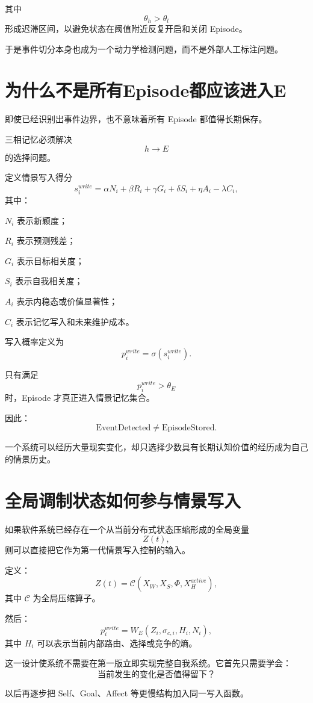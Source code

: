 其中
\[
\theta_h>\theta_l
\]
形成迟滞区间，以避免状态在阈值附近反复开启和关闭 Episode。

于是事件切分本身也成为一个动力学检测问题，而不是外部人工标注问题。

\section{为什么不是所有Episode都应该进入E}

即使已经识别出事件边界，也不意味着所有 Episode 都值得长期保存。

三相记忆必须解决
\[
h\rightarrow E
\]
的选择问题。

定义情景写入得分
\[
s_i^{write}
=
\alpha N_i
+
\beta R_i
+
\gamma G_i
+
\delta S_i
+
\eta A_i
-
\lambda C_i,
\]
其中：

$N_i$ 表示新颖度；

$R_i$ 表示预测残差；

$G_i$ 表示目标相关度；

$S_i$ 表示自我相关度；

$A_i$ 表示内稳态或价值显著性；

$C_i$ 表示记忆写入和未来维护成本。

写入概率定义为
\[
p_i^{write}
=
\sigma
\left(
s_i^{write}
\right).
\]

只有满足
\[
p_i^{write}>\theta_E
\]
时，Episode 才真正进入情景记忆集合。

因此：
\[
\boxed{
\mathrm{EventDetected}
\neq
\mathrm{EpisodeStored}.
}
\]

一个系统可以经历大量现实变化，却只选择少数具有长期认知价值的经历成为自己的情景历史。

\section{全局调制状态如何参与情景写入}

如果软件系统已经存在一个从当前分布式状态压缩形成的全局变量
\[
Z(t),
\]
则可以直接把它作为第一代情景写入控制的输入。

定义：
\[
Z(t)
=
\mathcal{C}
\left(
X_W,
X_S,
\Phi,
X_H^{active}
\right),
\]
其中 $\mathcal{C}$ 为全局压缩算子。

然后：
\[
p_i^{write}
=
W_E
\left(
Z_i,
\sigma_{c,i},
H_i,
N_i
\right),
\]
其中 $H_i$ 可以表示当前内部路由、选择或竞争的熵。

这一设计使系统不需要在第一版立即实现完整自我系统。它首先只需要学会：
\[
\boxed{
\text{当前发生的变化是否值得留下？}
}
\]

以后再逐步把 Self、Goal、Affect 等更慢结构加入同一写入函数。

